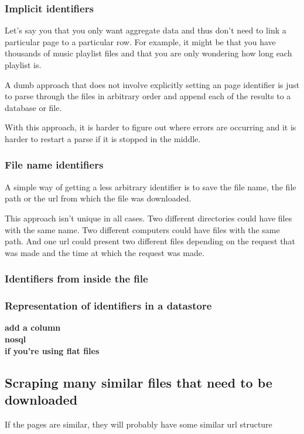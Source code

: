 \documentclass{article}
\newcommand\todo[1]{\textbf{#1}}
\begin{document}
\subsubsection{Implicit identifiers}
Let's say you that you only want aggregate data and thus don't need to link
a particular page to a particular row. For example, it might be that you have
thousands of music playlist files and that you are only wondering how long
each playlist is.

A dumb approach that does not involve explicitly setting an page identifier
is just to parse through the files in arbitrary order and append each of the
results to a database or file.

With this approach, it is harder to figure out where errors are occurring
and it is harder to restart a parse if it is stopped in the middle.

\subsubsection{File name identifiers}
A simple way of getting a less arbitrary identifier is to save the file name,
the file path or the url from which the file was downloaded.

This approach isn't unique in all cases. Two different directories could
have files with the same name. Two different computers could have files with
the same path. And one url could present two different files depending on
the request that was made and the time at which the request was made.

\subsubsection{Identifiers from inside the file}

\subsubsection{Representation of identifiers in a datastore}
\todo{
add a column\\
nosql\\
if you're using flat files
}
\subsection{Scraping many similar files that need to be downloaded}
If the pages are similar, they will probably have some similar url structure
\end{document}
